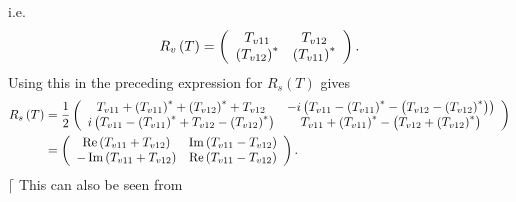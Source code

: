 \documentclass[aps,preprint]{revtex4}%
\begin{document}
i.e.
\begin{equation}
R_{v}\left(  T\right)  =\left(
\begin{array}
[c]{cc}%
T_{v11} & T_{v12}\\
\left(  T_{v12}\right)  ^{\ast} & \left(  T_{v11}\right)  ^{\ast}%
\end{array}
\right)  .
\end{equation}
Using this in the preceding expression for $R_{s}\left(  T\right)  $ gives
\begin{align}
R_{s}\left(  T\right)   &  =\frac{1}{2}\left(
\begin{array}
[c]{cc}%
T_{v11}+\left(  T_{v11}\right)  ^{\ast}+\left(  T_{v12}\right)  ^{\ast
}+T_{v12} & -i\left(  T_{v11}-\left(  T_{v11}\right)  ^{\ast}-\left(
T_{v12}-\left(  T_{v12}\right)  ^{\ast}\right)  \right) \\
i\left(  T_{v11}-\left(  T_{v11}\right)  ^{\ast}+T_{v12}-\left(
T_{v12}\right)  ^{\ast}\right)  & T_{v11}+\left(  T_{v11}\right)  ^{\ast
}-\left(  T_{v12}+\left(  T_{v12}\right)  ^{\ast}\right)
\end{array}
\right) \\
&  =\left(
\begin{array}
[c]{cc}%
\operatorname{Re}\left(  T_{v11}+T_{v12}\right)  & \operatorname{Im}\left(
T_{v11}-T_{v12}\right) \\
-\operatorname{Im}\left(  T_{v11}+T_{v12}\right)  & \operatorname{Re}\left(
T_{v11}-T_{v12}\right)
\end{array}
\right)  .
\end{align}
$\lceil$ This can also be seen from%
\end{document}
